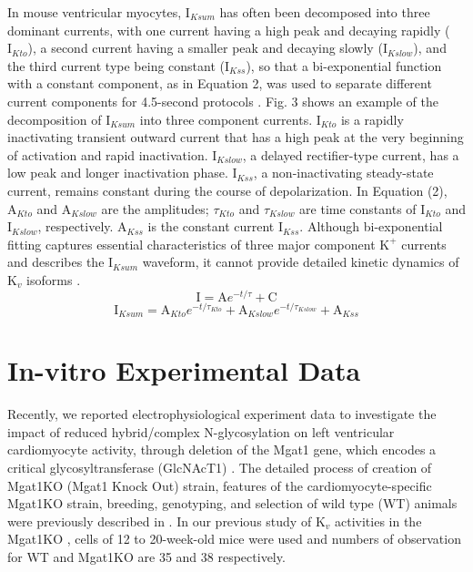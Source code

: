 \documentclass[journal]{IEEEtran}
\begin{document}
In mouse ventricular myocytes, $\text{I}_{Ksum}$ has often been decomposed into three dominant currents, with one current having a high peak and decaying rapidly ($\text{I}_{Kto}$), a second current having a smaller peak and decaying slowly ($\text{I}_{Kslow}$), and the third current type being constant ($\text{I}_{Kss}$), so that a bi-exponential function with a constant component, as in Equation 2, was used to separate different current components for 4.5-second protocols \cite{ednie2015reduced}. Fig. 3 shows an example of the decomposition of $\text{I}_{Ksum}$ into three component currents. $\text{I}_{Kto}$ is a rapidly inactivating transient outward current that has a high peak at the very beginning of activation and rapid inactivation. $\text{I}_{Kslow}$, a delayed rectifier-type current, has a low peak and longer inactivation phase. $\text{I}_{Kss}$, a non-inactivating steady-state current, remains constant during the course of depolarization. In Equation (2), $\text{A}_{Kto}$ and $\text{A}_{Kslow}$ are the amplitudes; $\tau_{Kto}$ and $\tau_{Kslow}$ are time constants of $\text{I}_{Kto}$ and $\text{I}_{Kslow}$, respectively. $\text{A}_{Kss}$ is the constant current $\text{I}_{Kss}$. Although bi-exponential fitting captures essential characteristics of three major component $\text{K}^{+}$ currents and describes the $\text{I}_{Ksum}$ waveform, it cannot provide detailed kinetic dynamics of $\text{K}_{v}$ isoforms \cite{plumlee2016calibrating}. 
\begin{equation}
    \text{I} = \text{A}e^{-t/\tau} + \text{C}
\end{equation}
\begin{equation}
    \text{I}_{Ksum} = \text{A}_{Kto} e^{-t/\tau_{Kto}} + \text{A}_{Kslow} e^{-t/\tau_{Kslow}} + \text{A}_{Kss}
\end{equation}

\section{In-vitro Experimental Data}
Recently, we reported electrophysiological experiment data to investigate the impact of reduced hybrid/complex N-glycosylation on left ventricular cardiomyocyte activity, through deletion of the Mgat1 gene, which encodes a critical glycosyltransferase (GlcNAcT1) \cite{ednie2019reduced, ednie2019reduced2}. The detailed process of creation of Mgat1KO (Mgat1 Knock Out) strain, features of the cardiomyocyte-specific Mgat1KO strain, breeding, genotyping, and selection of wild type (WT) animals were previously described in \cite{ednie2019reduced2}. In our previous study of $\text{K}_{v}$ activities in the Mgat1KO \cite{ednie2019reduced}, cells of 12 to 20-week-old mice were used and numbers of observation for WT and Mgat1KO are 35 and 38 respectively.
\end{document}
